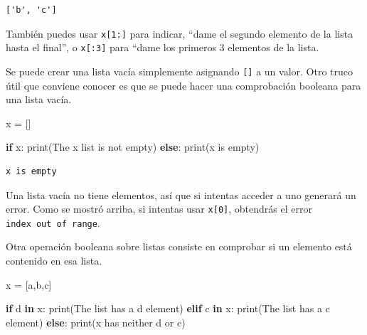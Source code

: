 \documentclass[
  letterpaper,
]{scrbook}
\newenvironment{Shaded}{\begin{snugshade}}{\end{snugshade}}
\newcommand{\BuiltInTok}[1]{\textcolor[rgb]{0.00,0.23,0.31}{#1}}
\newcommand{\ControlFlowTok}[1]{\textcolor[rgb]{0.00,0.23,0.31}{\textbf{#1}}}
\newcommand{\KeywordTok}[1]{\textcolor[rgb]{0.00,0.23,0.31}{\textbf{#1}}}
\newcommand{\NormalTok}[1]{\textcolor[rgb]{0.00,0.23,0.31}{#1}}
\newcommand{\OperatorTok}[1]{\textcolor[rgb]{0.37,0.37,0.37}{#1}}
\newcommand{\StringTok}[1]{\textcolor[rgb]{0.13,0.47,0.30}{#1}}
\begin{document}
\begin{verbatim}
['b', 'c']
\end{verbatim}

También puedes usar \texttt{x{[}1:{]}} para indicar, ``dame el segundo
elemento de la lista hasta el final'', o \texttt{x{[}:3{]}} para ``dame
los primeros 3 elementos de la lista.

Se puede crear una lista vacía simplemente asignando \texttt{{[}{]}} a
un valor. Otro truco útil que conviene conocer es que se puede hacer una
comprobación booleana para una lista vacía.

\begin{Shaded}
\begin{Highlighting}[]
\NormalTok{x }\OperatorTok{=}\NormalTok{ []}

\ControlFlowTok{if}\NormalTok{ x:}
  \BuiltInTok{print}\NormalTok{(}\StringTok{\textquotesingle{}The x list is not empty\textquotesingle{}}\NormalTok{)}
\ControlFlowTok{else}\NormalTok{:}
  \BuiltInTok{print}\NormalTok{(}\StringTok{\textquotesingle{}x is empty\textquotesingle{}}\NormalTok{)}
\end{Highlighting}
\end{Shaded}

\begin{verbatim}
x is empty
\end{verbatim}

Una lista vacía no tiene elementos, así que si intentas acceder a uno
generará un error. Como se mostró arriba, si intentas usar
\texttt{x{[}0{]}}, obtendrás el error \texttt{index\ out\ of\ range}.

Otra operación booleana sobre listas consiste en comprobar si un
elemento está contenido en esa lista.

\begin{Shaded}
\begin{Highlighting}[]
\NormalTok{x }\OperatorTok{=}\NormalTok{ [}\StringTok{\textquotesingle{}a\textquotesingle{}}\NormalTok{,}\StringTok{\textquotesingle{}b\textquotesingle{}}\NormalTok{,}\StringTok{\textquotesingle{}c\textquotesingle{}}\NormalTok{]}

\ControlFlowTok{if} \StringTok{\textquotesingle{}d\textquotesingle{}} \KeywordTok{in}\NormalTok{ x:}
  \BuiltInTok{print}\NormalTok{(}\StringTok{\textquotesingle{}The list has a d element\textquotesingle{}}\NormalTok{)}
\ControlFlowTok{elif} \StringTok{\textquotesingle{}c\textquotesingle{}} \KeywordTok{in}\NormalTok{ x:}
  \BuiltInTok{print}\NormalTok{(}\StringTok{\textquotesingle{}The list has a c element\textquotesingle{}}\NormalTok{)}
\ControlFlowTok{else}\NormalTok{:}
  \BuiltInTok{print}\NormalTok{(}\StringTok{\textquotesingle{}x has neither d or c\textquotesingle{}}\NormalTok{)}
\end{Highlighting}
\end{Shaded}
\end{document}
